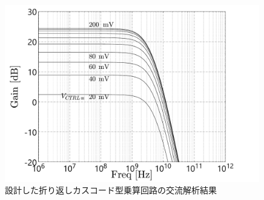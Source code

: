         \begin{figure}[!b]
            \centering
            \includegraphics[width=0.99\textwidth]{figures/chapter3/folded_mirror_ac_com.pdf}
            \caption{設計した折り返しカスコード型乗算回路の交流解析結果}
            \label{fig:3_folded_mirror_ac_com}
        \end{figure}





